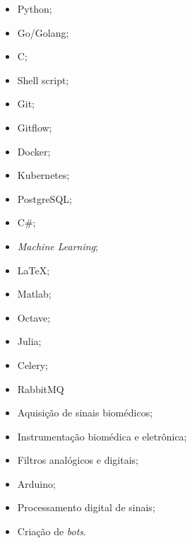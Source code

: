 \documentclass[11pt]{article}
\begin{document}
\begin{multicols}{3} %
\begin{itemize}
    \item Python;
    \item Go/Golang;
    \item C;
    \item Shell script;
    \item Git;
    \item Gitflow;
    \item Docker;
    \item Kubernetes;
    \item PostgreSQL;
    \item C\#;
    \item \textit{Machine Learning};
    \item \LaTeX ;
    \item Matlab;
    \item Octave;
    \item Julia;
    \item Celery;
    \item RabbitMQ
    \item Aquisição de sinais biomédicos;
    \item Instrumentação biomédica e eletrônica;
    \item Filtros analógicos e digitais;
    \item Arduino;
    \item Processamento digital de sinais;
    \item Criação de \textit{bots}.
\end{itemize}
\end{multicols}
\end{document}
